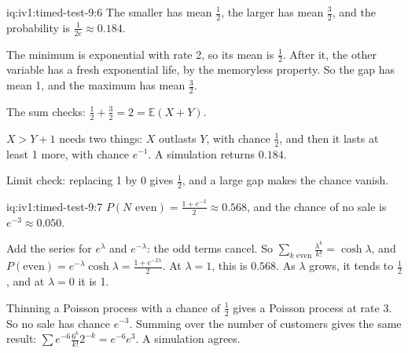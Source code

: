 \begin{solution}{iq:iv1:timed-test-9:6}
The smaller has mean $\frac12$, the larger has mean $\frac32$, and the probability is $\frac{1}{2e} \approx 0.184$.

The minimum is exponential with rate 2, so its mean is $\frac12$. After it, the other variable has a fresh exponential life, by the memoryless property. So the gap has mean 1, and the maximum has mean $\frac32$.

The sum checks: $\frac12 + \frac32 = 2 = \mathbb{E}(X + Y)$.

$X > Y + 1$ needs two things: $X$ outlasts $Y$, with chance $\frac12$, and then it lasts at least 1 more, with chance $e^{-1}$. A simulation returns $0.184$.

Limit check: replacing 1 by 0 gives $\frac12$, and a large gap makes the chance vanish.

\end{solution}

\begin{solution}{iq:iv1:timed-test-9:7}
$P(N \text{ even}) = \frac{1 + e^{-2}}{2} \approx 0.568$, and the chance of no sale is $e^{-3} \approx 0.050$.

Add the series for $e^{\lambda}$ and $e^{-\lambda}$: the odd terms cancel. So $\sum_{k \text{ even}}\frac{\lambda^k}{k!} = \cosh\lambda$, and $P(\text{even}) = e^{-\lambda}\cosh\lambda = \frac{1 + e^{-2\lambda}}{2}$. At $\lambda = 1$, this is $0.568$. As $\lambda$ grows, it tends to $\frac12$, and at $\lambda = 0$ it is 1.

Thinning a Poisson process with a chance of $\frac12$ gives a Poisson process at rate 3. So no sale has chance $e^{-3}$. Summing over the number of customers gives the same result: $\sum e^{-6}\frac{6^k}{k!}2^{-k} = e^{-6}e^{3}$. A simulation agrees.

\end{solution}

